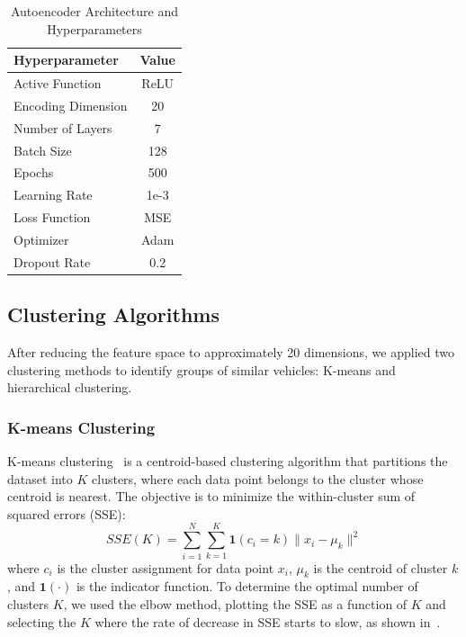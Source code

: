 \documentclass{article} %
\begin{document}
\begin{table}[ht]
   \centering
   \begin{tabular}{lc}
   \toprule
   \textbf{Hyperparameter} & \textbf{Value} \\ \midrule
   Active Function & ReLU \\
   Encoding Dimension & 20 \\
   Number of Layers & 7 \\
   Batch Size & 128 \\
   Epochs & 500 \\
   Learning Rate & 1e-3 \\
   Loss Function & MSE \\
   Optimizer & Adam \\
   Dropout Rate & 0.2 \\
   \bottomrule
   \end{tabular}
   \caption{Autoencoder Architecture and Hyperparameters}
   \label{tab:hyperparameter}
\end{table}



\subsection{Clustering Algorithms}
After reducing the feature space to approximately 20 dimensions, we applied two clustering methods to identify groups of similar vehicles: K-means and hierarchical clustering.

\subsubsection{K-means Clustering}
K-means clustering~\citep{macqueen1967kmeans,jain2010kmeans} is a centroid-based clustering algorithm that partitions the dataset into \( K \) clusters, where each data point belongs to the cluster whose centroid is nearest. The objective is to minimize the within-cluster sum of squared errors (SSE):
$$
SSE(K) = \sum_{i=1}^{N} \sum_{k=1}^{K} \mathbf{1}(c_i=k) \| x_i - \mu_k \|^2
$$
where \( c_i \) is the cluster assignment for data point \( x_i \), \( \mu_k \) is the centroid of cluster \( k \), and \( \mathbf{1}(\cdot) \) is the indicator function. To determine the optimal number of clusters \( K \), we used the elbow method, plotting the SSE as a function of \( K \) and selecting the \( K \) where the rate of decrease in SSE starts to slow,
as shown in~.
\end{document}
